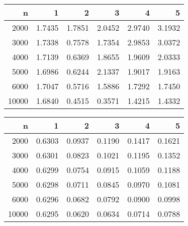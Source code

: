 \begin{table}[ht]
\centering
\begin{tabular}{rrrrrr}
  \hline
n & 1 & 2 & 3 & 4 & 5 \\ 
  \hline
2000 & 1.7435 & 1.7851 & 2.0452 & 2.9740 & 3.1932 \\ 
  3000 & 1.7338 & 0.7578 & 1.7354 & 2.9853 & 3.0372 \\ 
  4000 & 1.7139 & 0.6369 & 1.8655 & 1.9609 & 2.0333 \\ 
  5000 & 1.6986 & 0.6244 & 2.1337 & 1.9017 & 1.9163 \\ 
  6000 & 1.7047 & 0.5716 & 1.5886 & 1.7292 & 1.7450 \\ 
  10000 & 1.6840 & 0.4515 & 0.3571 & 1.4215 & 1.4332 \\ 
   \hline
\end{tabular}
\end{table}
\begin{table}[ht]
\centering
\begin{tabular}{rrrrrr}
  \hline
n & 1 & 2 & 3 & 4 & 5 \\ 
  \hline
2000 & 0.6303 & 0.0937 & 0.1190 & 0.1417 & 0.1621 \\ 
  3000 & 0.6301 & 0.0823 & 0.1021 & 0.1195 & 0.1352 \\ 
  4000 & 0.6299 & 0.0754 & 0.0915 & 0.1059 & 0.1188 \\ 
  5000 & 0.6298 & 0.0711 & 0.0845 & 0.0970 & 0.1081 \\ 
  6000 & 0.6296 & 0.0682 & 0.0792 & 0.0900 & 0.0998 \\ 
  10000 & 0.6295 & 0.0620 & 0.0634 & 0.0714 & 0.0788 \\ 
   \hline
\end{tabular}
\end{table}
